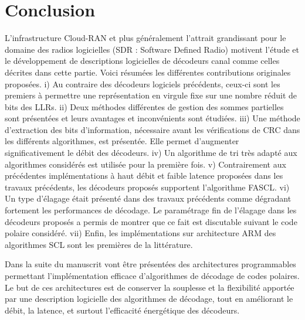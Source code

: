 \begin{table}[t]
{{\begin{tabular}{r|c|c|c c c c| c c c| c c c}
    \end{tabular}
    }}
  \end{table}

\section{Conclusion}

L'infrastructure Cloud-RAN et plus généralement l'attrait grandissant pour le domaine des radios logicielles (SDR : Software Defined Radio) motivent l'étude et le développement de descriptions logicielles de décodeurs canal comme celles décrites dans cette partie. Voici résumées les différentes contributions originales proposées. i) Au contraire des décodeurs logiciels précédents, ceux-ci sont les premiers à permettre une représentation en virgule fixe sur une nombre réduit de bits des LLRs. ii) Deux méthodes différentes de gestion des sommes partielles sont présentées et leurs avantages et inconvénients sont étudiées. iii) Une méthode d'extraction des bits d'information, nécessaire avant les vérifications de CRC dans les différents algorithmes, est présentée. Elle permet d'augmenter significativement le débit des décodeurs. iv) Un algorithme de tri \cite{schreier_tournament_1932} très adapté aux algorithmes considérés est utilisée pour la première fois. v) Contrairement aux précédentes implémentations à haut débit et faible latence proposées dans les travaux précédents, les décodeurs proposés supportent l'algorithme FASCL. vi) Un type d'élagage était présenté dans des travaux précédents comme dégradant fortement les performances de décodage. Le paramétrage fin de l'élagage dans les décodeurs proposés a permis de montrer que ce fait est discutable suivant le code polaire considéré. vii) Enfin, les implémentations sur architecture ARM des algorithmes SCL sont les premières de la littérature.

Dans la suite du manuscrit vont être présentées des architectures programmables permettant l'implémentation efficace d'algorithmes de décodage de codes polaires. Le but de ces architectures est de conserver  la souplesse et la flexibilité apportée par une description logicielle des algorithmes de décodage, tout en améliorant le débit, la latence, et surtout l'efficacité énergétique des décodeurs.